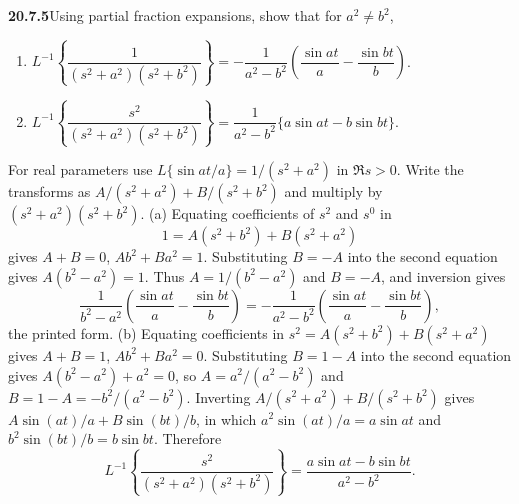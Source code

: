 \par\bigskip
\noindent\textbf{20.7.5}\quad Using partial fraction expansions,
show that for $a^{2}\ne b^{2}$,
\begin{enumerate}
\item[(a)] $L^{-1}\left\{\dfrac{1}{(s^{2}+a^{2})(s^{2}+b^{2})}
\right\}=-\dfrac{1}{a^{2}-b^{2}}\left(\dfrac{\sin at}{a}
-\dfrac{\sin bt}{b}\right)$.
\item[(b)] $L^{-1}\left\{\dfrac{s^{2}}{(s^{2}+a^{2})(s^{2}+b^{2})}
\right\}=\dfrac{1}{a^{2}-b^{2}}\{a\sin at-b\sin bt\}$.
\end{enumerate}
\par{}
\solution
For real parameters use
$L\{\sin at/a\}=1/(s^2+a^2)$ in $\Re s>0$.
Write the transforms as $A/(s^2+a^2)+B/(s^2+b^2)$ and
multiply by $(s^2+a^2)(s^2+b^2)$.
(a) Equating coefficients of $s^2$ and $s^0$ in
\[
1=A(s^2+b^2)+B(s^2+a^2)
\]
gives $A+B=0$, $Ab^2+Ba^2=1$. Substituting $B=-A$ into the
second equation gives $A(b^2-a^2)=1$. Thus
$A=1/(b^2-a^2)$ and $B=-A$, and inversion gives
\[
\boxed{\frac1{b^2-a^2}\left(\frac{\sin at}{a}-\frac{\sin bt}{b}\right)}
=-\frac1{a^2-b^2}\left(\frac{\sin at}{a}-\frac{\sin bt}{b}\right),
\]
the printed form.
(b) Equating coefficients in
$s^2=A(s^2+b^2)+B(s^2+a^2)$ gives
$A+B=1$, $Ab^2+Ba^2=0$. Substituting $B=1-A$ into the second
equation gives $A(b^2-a^2)+a^2=0$, so
$A=a^2/(a^2-b^2)$ and $B=1-A=-b^2/(a^2-b^2)$. Inverting
$A/(s^2+a^2)+B/(s^2+b^2)$ gives
$A\sin(at)/a+B\sin(bt)/b$, in which $a^2\sin(at)/a=a\sin at$
and $b^2\sin(bt)/b=b\sin bt$. Therefore
\[
\boxed{L^{-1}\left\{\frac{s^2}{(s^2+a^2)(s^2+b^2)}\right\}
=\frac{a\sin at-b\sin bt}{a^2-b^2}}.
\]

